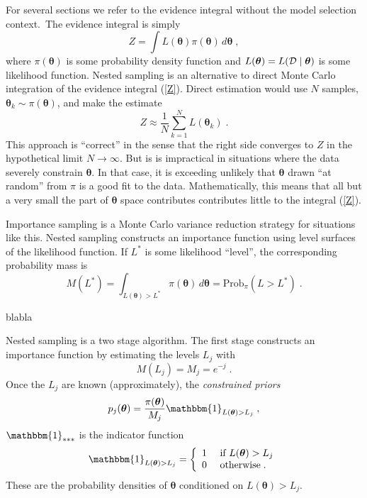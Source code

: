 \documentclass[letterpaper, preprint]{aastex}
\newcommand{\bth} {\boldsymbol \theta}
\begin{document}
For several sections we refer to the evidence integral without the model selection context.\
The evidence integral is simply
\begin{equation}
Z =  \int L(\bth) \pi(\bth) \,d\bth \; ,
\label{Z}  \end{equation}
where $\pi(\bth)$ is some probability density function and $L(\bth) = L(\cal D \mid \bth)$ is some likelihood
function.
Nested sampling is an alternative to direct Monte Carlo integration of the evidence integral (\ref{Z}).
Direct estimation would use $N$ samples, $\bth_k \sim \pi(\bth)$,
and make the estimate
$$
Z \approx \frac{1}{N} \sum_{k=1}^N L( \bth_k) \; .
$$
This approach is ``correct'' in the sense that the right side converges to $Z$ in the 
hypothetical limit $N \to \infty$.
But is is impractical in situations where the data severely constrain $\bth$.
In that case, it is exceeding unlikely that $\bth$ drawn ``at random'' from $\pi$ is a good fit 
to the data.
Mathematically, this means that all but a very small the part of $\bth$ space contributes 
contributes little to the integral (\ref{Z}).

Importance sampling \cite{IS} is a Monte Carlo variance reduction strategy for situations like this.
Nested sampling constructs an importance function using level surfaces of the likelihood function.
If $L^*$ is some likelihood ``level'', the corresponding probability mass is
\begin{equation}
M(L^*) = \int_{L(\bth)>L^*} \pi(\bth)\,d\bth = \mbox{Prob}_{\pi}(L > L^*) \; .
\label{M} \end{equation}

blabla

Nested sampling is a two stage algorithm.
The first stage constructs an importance function by estimating the levels $L_j$ with
\begin{equation}
M(L_j) = M_j = e^{-j} \; .
\label{Lj} \end{equation}
Once the $L_j$ are known (approximately), the {\em constrained priors}
\begin{equation}
p_j(\bth) = \frac{\pi(\bth)}{M_j} \mathbbm{1}_{L(\bth)>L_j} \; ,
\label{pj}  \end{equation}
$\mathbbm{1}_{***}$ is the indicator function
$$
\mathbbm{1}_{L(\bth)>L_j} = \left\{ \begin{array}{ll} 1 & \mbox{ if } L(\bth) > L_j \\ 
                                                      0 & \mbox{ otherwise} \; .
                                     \end{array} \right.
$$
These are the probability densities of $\bth$ conditioned on $L(\bth) > L_j$.
\end{document}

